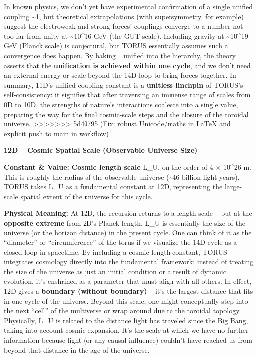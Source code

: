 \documentclass[]{article}
\begin{document}
In known physics, we don't yet have experimental confirmation of a
single unified coupling \textasciitilde{}1, but theoretical
extrapolations (with supersymmetry, for example) suggest the electroweak
and strong forces' couplings converge to a number not too far from unity
at \textasciitilde{}10\^{}16 GeV (the GUT scale)​. Including gravity at
\textasciitilde{}10\^{}19 GeV (Planck scale) is conjectural, but TORUS
essentially assumes such a convergence does happen. By baking \alpha\_unified
 into the hierarchy, the theory asserts that the \textbf{unification
is achieved within one cycle}, and we don't need an external energy or
scale beyond the 14D loop to bring forces together. In summary, 11D's
unified coupling constant is a \textbf{unitless linchpin} of TORUS's
self-consistency: it signifies that after traversing an immense range of
scales from 0D to 10D, the strengths of nature's interactions coalesce
into a single value, preparing the way for the final cosmic-scale steps
and the closure of the toroidal universe.
>>>>>>> 5d40795 (Fix: robust Unicode/maths in LaTeX and explicit push to main in workflow)

\textbf{12D -- Cosmic Spatial Scale (Observable Universe Size)}

\textbf{Constant \& Value:} \textbf{Cosmic length scale} L\_U, on the
order of 4 × 10\^{}26 m​. This is roughly the radius of the observable
universe (\textasciitilde{}46 billion light years). TORUS takes L\_U as
a fundamental constant at 12D, representing the large-scale spatial
extent of the universe for this cycle.

\textbf{Physical Meaning:} At 12D, the recursion returns to a length
scale -- but at the \textbf{opposite extreme} from 2D's Planck length.
L\_U is essentially the size of the universe (or the horizon distance)
in the present cycle​. One can think of it as the ``diameter'' or
``circumference'' of the torus if we visualize the 14D cycle as a closed
loop in spacetime​. By including a cosmic-length constant, TORUS
integrates cosmology directly into the fundamental framework: instead of
treating the size of the universe as just an initial condition or a
result of dynamic evolution, it's enshrined as a parameter that must
align with all others. In effect, 12D gives a \textbf{boundary (without
boundary)} -- it's the largest distance that fits in one cycle of the
universe. Beyond this scale, one might conceptually step into the next
``cell'' of the multiverse or wrap around due to the toroidal topology.
Physically, L\_U is related to the distance light has traveled since the
Big Bang, taking into account cosmic expansion. It's the scale at which
we have no further information because light (or any causal influence)
couldn't have reached us from beyond that distance in the age of the
universe.
\end{document}
